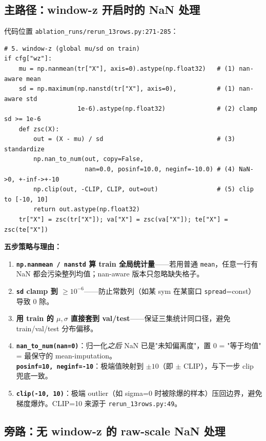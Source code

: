 \documentclass[10.5pt,a4paper]{article}
\begin{document}
\subsection{主路径：window-z 开启时的 NaN 处理}

代码位置 \texttt{ablation\_runs/rerun\_13rows.py:271-285}：

\begin{lstlisting}
# 5. window-z (global mu/sd on train)
if cfg["wz"]:
    mu = np.nanmean(tr["X"], axis=0).astype(np.float32)   # (1) nan-aware mean
    sd = np.maximum(np.nanstd(tr["X"], axis=0),           # (1) nan-aware std
                    1e-6).astype(np.float32)              # (2) clamp sd >= 1e-6
    def zsc(X):
        out = (X - mu) / sd                               # (3) standardize
        np.nan_to_num(out, copy=False,
                      nan=0.0, posinf=10.0, neginf=-10.0) # (4) NaN->0, +-inf->+-10
        np.clip(out, -CLIP, CLIP, out=out)                # (5) clip to [-10, 10]
        return out.astype(np.float32)
    tr["X"] = zsc(tr["X"]); va["X"] = zsc(va["X"]); te["X"] = zsc(te["X"])
\end{lstlisting}

\textbf{五步策略与理由：}
\begin{enumerate}[leftmargin=2em,itemsep=2pt,topsep=2pt]
  \item \textbf{\texttt{np.nanmean / nanstd} 算 train 全局统计量}——若用普通 \texttt{mean}，任意一行有 NaN 都会污染整列均值；nan-aware 版本只忽略缺失格子。
  \item \textbf{\texttt{sd} clamp 到 $\ge 10^{-6}$}——防止常数列（如某 sym 在某窗口 \texttt{spread}=const）导致 $0$ 除。
  \item \textbf{用 train 的 $\mu, \sigma$ 直接套到 val/test}——保证三集统计同口径，避免 train/val/test 分布偏移。
  \item \textbf{\texttt{nan\_to\_num(nan=0)}}：归一化\emph{之后} NaN 已是"未知偏离度"，置 0 = "等于均值" = 最保守的 mean-imputation。\\
        \textbf{\texttt{posinf=10, neginf=-10}}：极端值映射到 $\pm 10$（即 $\pm$ CLIP），与下一步 clip 兜底一致。
  \item \textbf{\texttt{clip(-10, 10)}}：极端 outlier（如 sigma=0 时被除爆的样本）压回边界，避免梯度爆炸。CLIP=10 来源于 \texttt{rerun\_13rows.py:49}。
\end{enumerate}

\subsection{旁路：无 window-z 的 raw-scale NaN 处理}
\end{document}
